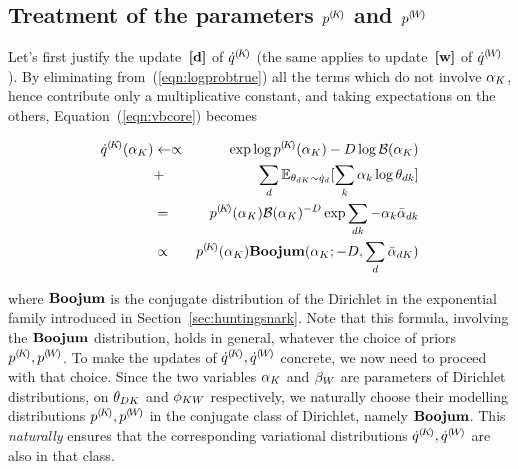 \subsection{Treatment of the parameters ${p}^{(\!{K}\!)}$ and ${p}^{(\!{W}\!)}$}
Let's first justify the update~$\textbf{[d]}$ of ${\dot{q}}^{(\!{K}\!)}$ (the same applies to update~$\textbf{[w]}$ of ${\dot{q}}^{(\!{W}\!)}$). By eliminating from~(\ref{eqn:logprobtrue}) all the terms which do not involve $\alpha_K$, hence contribute only a multiplicative constant, and taking expectations on the others, Equation~(\ref{eqn:vbcore}) becomes
\begin{small}
\begin{eqnarray*}
\cpnt{\dot{q}}{K}(\vmK_K)
& \assignn\propto &
\exp\log\cpnt{p}{K}(\vmK_K)-D\log\mathcal{B}(\vmK_K)\\
& + & \sum_d\expectation_{\vmDK_{dK}\sim\dot{q}_d}[\sum_k\vmK_k\log\vmDK_{dk}]\\
& = &
\cpnt{p}{K}(\vmK_K)\mathcal{B}(\vmK_K)^{-D}\exp\sum_{dk}-\vmK_k\vvmbDK_{dk}\\
& \propto &
\cpnt{p}{K}(\vmK_K)\mbeta(\vmK_K;-D,\sum_d\vvmbDK_{dK})
\end{eqnarray*}
\end{small}
where $\mathbf{Boojum}$ is the conjugate distribution of the Dirichlet in the exponential family introduced in Section~\ref{sec:huntingsnark}. Note that this formula, involving the $\mathbf{Boojum}$ distribution, holds in general, whatever the choice of priors ${p}^{(\!{K}\!)},{p}^{(\!{W}\!)}$. To make the updates of ${\dot{q}}^{(\!{K}\!)},{\dot{q}}^{(\!{W}\!)}$ concrete, we now need to proceed with that choice. Since the two variables $\alpha_K$ and $\beta_W$ are parameters of Dirichlet distributions, on $\theta_{DK}$ and $\phi_{KW}$ respectively, we naturally choose their modelling distributions ${p}^{(\!{K}\!)},{p}^{(\!{W}\!)}$ in the conjugate class of Dirichlet, namely $\mathbf{Boojum}$. This {\em naturally} ensures that the corresponding variational distributions ${\dot{q}}^{(\!{K}\!)},{\dot{q}}^{(\!{W}\!)}$ are also in that class.

